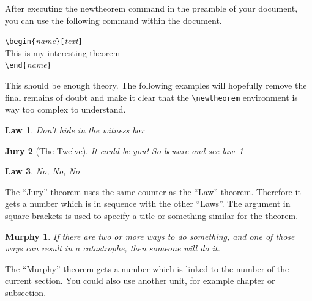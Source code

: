 After executing the {newtheorem} command in the preamble of your
document, you can use the following command within the document.

\begin{code}
\verb|\begin{|\emph{name}\verb|}[|\emph{text}\verb|]|\\
This is my interesting theorem\\
\verb|\end{|\emph{name}\verb|}|     
\end{code}

This should be enough theory. The following examples will hopefully
remove the final remains of doubt and make it clear that the
\verb|\newtheorem| environment is way too complex to understand.

\begin{singlespace}
\begin{example}
\newtheorem{law}{Law}
\newtheorem{jury}[law]{Jury}
\begin{law} \label{law:box}
Don't hide in the witness box
\end{law}
\begin{jury}[The Twelve]
It could be you! So beware and
see law~\ref{law:box}\end{jury}
\begin{law}No, No, No\end{law}
\end{example}
\end{singlespace}

The ``Jury'' theorem uses the same counter as the ``Law''
theorem. Therefore it gets a number which is in sequence with
the other ``Laws''. The argument in square brackets is used to specify 
a title or something similar for the theorem.

\begin{singlespace}
\begin{example}
\flushleft
\newtheorem{mur}{Murphy}[section]
\begin{mur}
If there are two or more 
ways to do something, and 
one of those ways can result 
in a catastrophe, then 
someone will do it.\end{mur}
\end{example}
\end{singlespace}

The ``Murphy'' theorem gets a number which is linked to the number of
the current section. You could also use another unit, for example chapter or
subsection.

